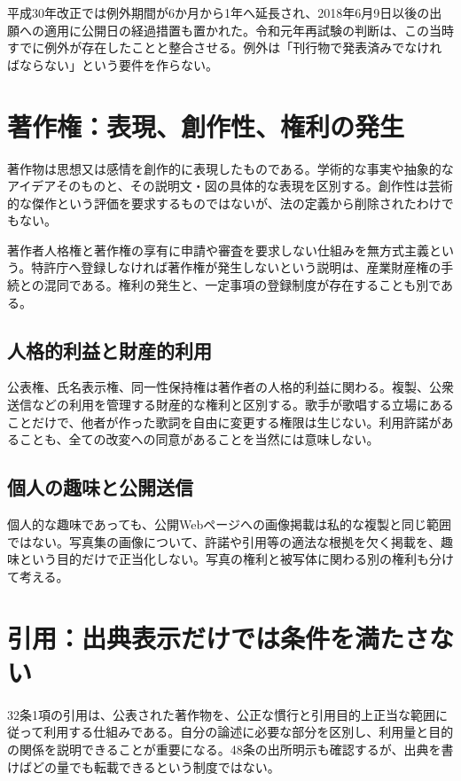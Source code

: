 平成30年改正では例外期間が6か月から1年へ延長され、2018年6月9日以後の出願への適用に公開日の経過措置も置かれた\parencite{ip_novelty_grace2018}。令和元年再試験の判断は、この当時すでに例外が存在したことと整合させる。例外は「刊行物で発表済みでなければならない」という要件を作らない。

\section{著作権：表現、創作性、権利の発生}
\label{theory:ip:copyright}
著作物は思想又は感情を創作的に表現したものである。学術的な事実や抽象的なアイデアそのものと、その説明文・図の具体的な表現を区別する。創作性は芸術的な傑作という評価を要求するものではないが、法の定義から削除されたわけでもない。

著作者人格権と著作権の享有に申請や審査を要求しない仕組みを無方式主義という\parencite{ip_copyright_statute}。特許庁へ登録しなければ著作権が発生しないという説明は、産業財産権の手続との混同である。権利の発生と、一定事項の登録制度が存在することも別である。

\subsection{人格的利益と財産的利用}
\label{theory:ip:personality}
公表権、氏名表示権、同一性保持権は著作者の人格的利益に関わる。複製、公衆送信などの利用を管理する財産的な権利と区別する。歌手が歌唱する立場にあることだけで、他者が作った歌詞を自由に変更する権限は生じない。利用許諾があることも、全ての改変への同意があることを当然には意味しない。

\subsection{個人の趣味と公開送信}
\label{theory:ip:public_web}
個人的な趣味であっても、公開Webページへの画像掲載は私的な複製と同じ範囲ではない。写真集の画像について、許諾や引用等の適法な根拠を欠く掲載を、趣味という目的だけで正当化しない。写真の権利と被写体に関わる別の権利も分けて考える。

\section{引用：出典表示だけでは条件を満たさない}
\label{theory:ip:quotation}
32条1項の引用は、公表された著作物を、公正な慣行と引用目的上正当な範囲に従って利用する仕組みである\parencite{ip_copyright_statute}。自分の論述に必要な部分を区別し、利用量と目的の関係を説明できることが重要になる。48条の出所明示も確認するが、出典を書けばどの量でも転載できるという制度ではない。

